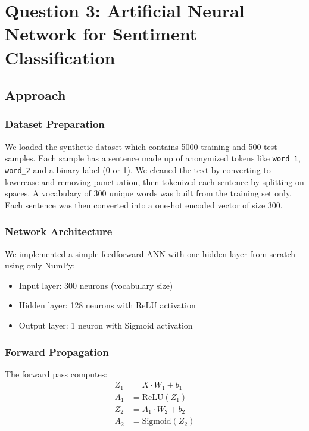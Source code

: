 \documentclass[sigconf]{acmart}
\begin{document}

\section{Question 3: Artificial Neural Network for Sentiment Classification}

\subsection{Approach}

\subsubsection{Dataset Preparation}
We loaded the synthetic dataset which contains 5000 training and 500 test samples. Each sample has a sentence made up of anonymized tokens like \texttt{word\_1}, \texttt{word\_2} and a binary label (0 or 1). We cleaned the text by converting to lowercase and removing punctuation, then tokenized each sentence by splitting on spaces. A vocabulary of 300 unique words was built from the training set only. Each sentence was then converted into a one-hot encoded vector of size 300.

\subsubsection{Network Architecture}
We implemented a simple feedforward ANN with one hidden layer from scratch using only NumPy:
\begin{itemize}
    \item Input layer: 300 neurons (vocabulary size)
    \item Hidden layer: 128 neurons with ReLU activation
    \item Output layer: 1 neuron with Sigmoid activation
\end{itemize}

\subsubsection{Forward Propagation}
The forward pass computes:
\begin{align}
Z_1 &= X \cdot W_1 + b_1 \\
A_1 &= \text{ReLU}(Z_1) \\
Z_2 &= A_1 \cdot W_2 + b_2 \\
A_2 &= \text{Sigmoid}(Z_2)
\end{align}
\end{document}

